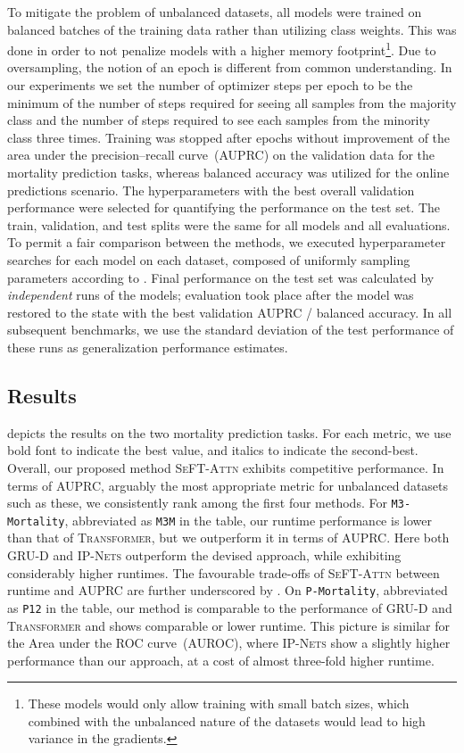 \documentclass{article}
\newcommand{\methodname}     {\textsc{SeFT}\xspace}
\newcommand{\dataset}[1]{\texttt{#1}}
\newcommand{\method}[1]{\textsc{#1}}
\begin{document}
To mitigate the problem of unbalanced datasets, all models were trained on
balanced batches of the training data rather than utilizing class weights. This
was done in order to not penalize models with a higher memory footprint\footnote{These
models would only allow training with small batch sizes, which combined with
the unbalanced nature of the datasets would lead to high variance in the
gradients.}. Due to oversampling, the notion of an epoch is different from
common understanding. In our experiments we set the number of optimizer steps
per epoch to be the minimum of the number of steps required for seeing all
samples from the majority class and the number of steps required to see each
samples from the minority class three times.
Training was stopped after  epochs without improvement of the area under
the precision--recall curve~(AUPRC) on the validation data for the mortality
prediction tasks, whereas balanced accuracy was utilized for the online
predictions scenario. The hyperparameters with the best overall validation
performance were selected for quantifying the performance on the test set. The
train, validation, and test splits were the same for all models and all
evaluations.
To permit a fair comparison between the methods, we executed hyperparameter
searches for each model on each dataset, composed of uniformly sampling 
parameters according to .
Final performance on the test set was calculated by~ \emph{independent} runs
of the models; evaluation took place after the model was restored to the state
with the best validation AUPRC / balanced accuracy. In all subsequent
benchmarks, we use the standard deviation of the test performance of these runs
as generalization performance estimates.

\subsection{Results}\label{sec:results}


 depicts the results on the two mortality
prediction tasks. For each metric, we use bold font to indicate the best
value, and italics to indicate the second-best. Overall, our proposed
method \method{\methodname-Attn} exhibits competitive performance. In
terms of AUPRC, arguably the most appropriate metric for unbalanced
datasets such as these, we consistently rank among the first four
methods.
For \dataset{M3-Mortality}, abbreviated as \dataset{M3M} in the table, our
runtime performance is lower than that of \method{Transformer}, but we
outperform it in terms of AUPRC.  Here both \method{GRU-D} and \method{IP-Nets}
outperform the devised approach, while exhibiting considerably higher runtimes.
The favourable trade-offs of \method{\methodname-Attn} between runtime and
AUPRC are further underscored by .
On \dataset{P-Mortality}, abbreviated as \dataset{P12} in the table, our
method is comparable to the performance of \method{GRU-D} and
\method{Transformer} and shows comparable or lower runtime.  This
picture is similar for the Area under the ROC curve~(AUROC), where
\method{IP-Nets} show a slightly higher performance than our approach, at
a cost of almost three-fold higher runtime.
\end{document}
